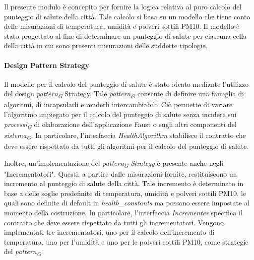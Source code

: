 Il presente modulo è concepito per fornire la logica relativa al puro calcolo del punteggio di salute della città. Tale calcolo si basa su un modello che tiene conto delle misurazioni di temperatura, umidità e polveri sottili PM10. Il modello è stato progettato al fine di determinare un punteggio di salute per ciascuna cella della città in cui sono presenti misurazioni delle suddette tipologie.

\paragraph*{Design Pattern Strategy}

Il modello per il calcolo del punteggio di salute è stato ideato mediante l'utilizzo del design \textit{pattern}\textsubscript{\textit{G}} Strategy. Tale \textit{pattern}\textsubscript{\textit{G}} consente di definire una famiglia di algoritmi, di incapsularli e renderli intercambiabili. Ciò permette di variare l'algoritmo impiegato per il calcolo del punteggio di salute senza incidere sui \textit{processi}\textsubscript{\textit{G}} di elaborazione dell'applicazione Faust o sugli altri componenti del \textit{sistema}\textsubscript{\textit{G}}. In particolare, l'interfaccia \textit{HealthAlgorithm} stabilisce il contratto che deve essere rispettato da tutti gli algoritmi per il calcolo del punteggio di salute.


Inoltre, un'implementazione del \textit{pattern}\textsubscript{\textit{G}} \textit{Strategy} è presente anche negli "Incrementatori". Questi, a partire dalle misurazioni fornite, restituiscono un incremento al punteggio di salute della città. Tale incremento è determinato in base a delle soglie predefinite di temperatura, umidità e polveri sottili PM10, le quali sono definite di default in \textit{health\_constants} ma possono essere impostate al momento della costruzione. In particolare, l'interfaccia \textit{Incrementer} specifica il contratto che deve essere rispettato da tutti gli incrementatori. Vengono implementati tre incrementatori, uno per il calcolo dell'incremento di temperatura, uno per l'umidità e uno per le polveri sottili PM10, come strategie del \textit{pattern}\textsubscript{\textit{G}}.

